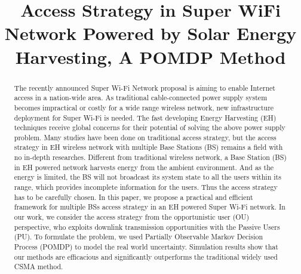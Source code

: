 \documentclass[conference]{IEEEtran}
\begin{document}
\title{Access Strategy in Super WiFi Network Powered by Solar Energy Harvesting, A POMDP Method}

\author{
	\small{}}
\maketitle

\begin{abstract}
The recently announced Super Wi-Fi Network proposal is aiming to enable Internet access in a nation-wide area.
As traditional cable-connected power supply system becomes impractical or costly for a wide range wireless network,
new infrastructure deployment for Super Wi-Fi is needed.
The fast developing Energy Harvesting (EH) techniques receive global 
concerns for their potential of solving the above power supply problem. 
Many studies have been done on traditional access strategy,
but the access strategy in EH wireless network with multiple Base Stations (BS)
remains a field with no in-depth researches.
Different from traditional wireless network,
a Base Station (BS) in EH powered network harvests energy from the ambient environment.
And as the energy is limited, 
the BS will not broadcast its system state to all the users within its range,
which provides incomplete information for the users. 
Thus the access strategy has to be carefully chosen.
In this paper, we propose a practical and efficient framework for multiple BSs access strategy
in an EH powered Super Wi-Fi network.
In our work, we consider the access strategy from the opportunistic user (OU) perspective,
who exploits downlink transmission opportunities with the Passive Users (PU).
To formulate the problem,
we used Partially Observable Markov Decision Process (POMDP) to model the
real world uncertainty.
Simulation results show that our methods are efficacious and significantly outperforms
the traditional widely used CSMA method.
\end{abstract}
\IEEEpeerreviewmaketitle
\end{document}
